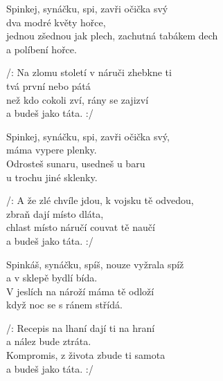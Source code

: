 
\ve{}
Spinkej, synáčku, spi, zavři očička svý\\
dva modré květy hořce, \\
jednou zšednou jak plech, zachutná tabákem dech\\
a políbení hořce. 

\re{}
/: Na zlomu století v náruči zhebkne ti\\
tvá první nebo pátá\\
než kdo cokoli zví, rány se zajizví\\
a budeš jako táta.  :/

\ve{}
Spinkej, synáčku, spi, zavři očička svý,\\
máma vypere plenky.\\
Odrosteš sunaru, usedneš u baru\\
u trochu jiné sklenky.

\re{}
/: A že zlé chvíle jdou, k vojsku tě odvedou,\\
zbraň dají místo dláta,\\
chlast místo náručí couvat tě naučí\\
a budeš jako táta. :/

\ve{}
Spinkáš, synáčku, spíš, nouze vyžrala spíž\\
a v sklepě bydlí bída.\\
V jeslích na nároží máma tě odloží\\
když noc se s ránem střídá.

\re{}
/: Recepis na lhaní dají ti na hraní\\
a nález bude ztráta.\\
Kompromis, z života zbude ti samota\\
a budeš jako táta. :/

\esong